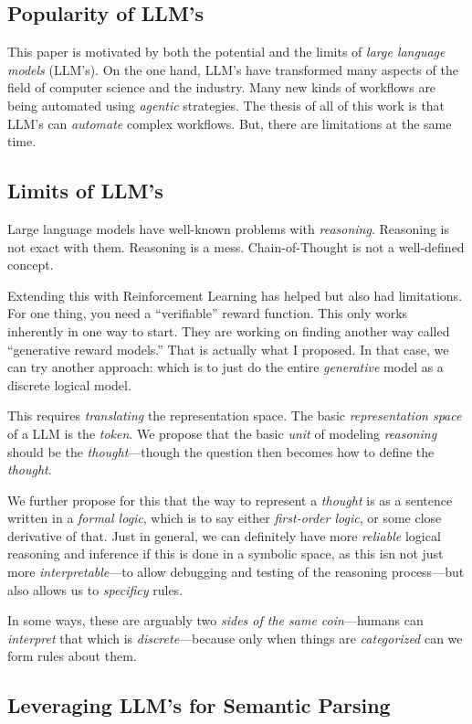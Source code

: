 \label{sec:contributions}
\subsection{Popularity of LLM's}
This paper is motivated by both the potential and the limits of {\em large language models} (LLM's).
On the one hand, LLM's have transformed many aspects of the field of computer science and the industry.
Many new kinds of workflows are being automated using {\em agentic} strategies.
The thesis of all of this work is that LLM's can {\em automate} complex workflows.
But, there are limitations at the same time.

\subsection{Limits of LLM's}
Large language models have well-known problems with {\em reasoning}.
Reasoning is not exact with them.
Reasoning is a mess.
Chain-of-Thought is not a well-defined concept.

Extending this with Reinforcement Learning has helped but also had limitations.
For one thing, you need a ``verifiable'' reward function.
This only works inherently in one way to start.
They are working on finding another way called ``generative reward models.''
That is actually what I proposed.
In that case, we can try another approach: which is to just do the entire {\em generative} model as a discrete logical model.

This requires {\em translating} the representation space.
The basic {\em representation space} of a LLM is the {\em token}.
We propose that the basic {\em unit} of modeling {\em reasoning} should be the {\em thought}---though the question then becomes how to define the {\em thought}.

We further propose for this that the way to represent a {\em thought} is as a sentence written in a {\em formal logic}, which is to say either {\em first-order logic}, or some close derivative of that.
Just in general, we can definitely have more {\em reliable} logical reasoning and inference if this is done in a symbolic space, as this isn not just more {\em interpretable}---to allow debugging and testing of the reasoning process---but also allows us to {\em specificy} rules.

In some ways, these are arguably two {\em sides of the same coin}---humans can {\em interpret} that which is {\em discrete}---because only when things are {\em categorized} can we form rules about them.

\subsection{Leveraging LLM's for Semantic Parsing}